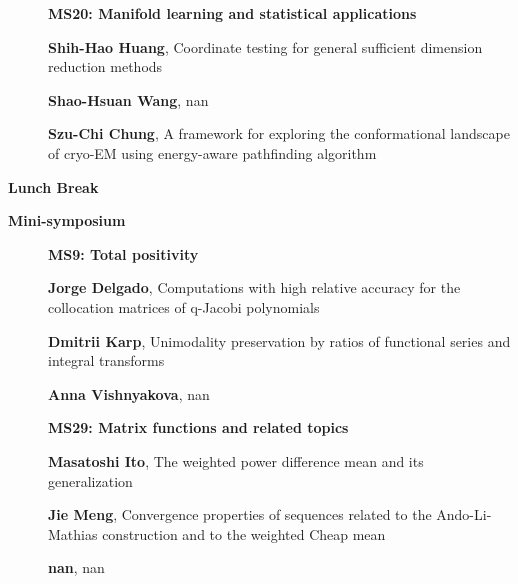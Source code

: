 \documentclass[ILAS2025-program.tex]{subfiles}
\begin{document}
\begin{description}
\begin{description}
        \end{description}
    \begin{description}
    \item[] {\color{mstitle}\textbf{MS20: Manifold learning and statistical applications}} 
    \item[] \textbf{Shih-Hao Huang}, Coordinate testing for general sufficient dimension reduction methods
        \item[] \textbf{Shao-Hsuan Wang}, nan
        \item[] \textbf{Szu-Chi Chung}, A framework for exploring the conformational landscape of cryo-EM using energy-aware pathfinding algorithm
        \end{description}
    \item[\info{12:30\textrm{--}14:00}] \textbf{Lunch Break} \info{}
    \item[\info{14:00\textrm{--}15:30}] \textbf{Mini-symposium} 
    \begin{description}
    \item[] {\color{mstitle}\textbf{MS9: Total positivity}} 
    \item[] \textbf{Jorge Delgado}, Computations with high relative accuracy for the collocation matrices of q-Jacobi polynomials
        \item[] \textbf{Dmitrii Karp}, Unimodality preservation by ratios of functional series and integral transforms
        \item[] \textbf{Anna Vishnyakova}, nan
        \end{description}
    \begin{description}
    \item[] {\color{mstitle}\textbf{MS29: Matrix functions and related topics}} 
    \item[] \textbf{Masatoshi Ito}, The weighted power difference mean and its generalization
        \item[] \textbf{Jie Meng}, Convergence properties of sequences related to the Ando-Li-Mathias construction and to the weighted Cheap mean
        \item[] \textbf{nan}, nan
        \end{description}
    \begin{description}

\end{description}
\end{description}
\end{document}

